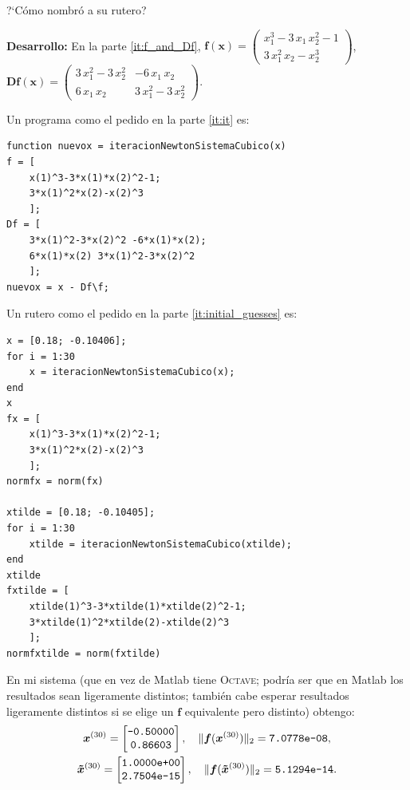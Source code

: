 \documentclass[letter,11pt]{article}
\newcommand{\matlab}{{\sc Matlab} }
\begin{document}
\begin{enumerate}
\begin{enumerate}
\medskip
\noindent ?`C\'omo nombr\'o a su rutero?\newline
{}

\end{enumerate}

\textbf{Desarrollo:} En la parte \ref{it:f_and_Df}, $\boldsymbol{f}(\boldsymbol{x}) = \begin{pmatrix} x_1^3 - 3 \, x_1 \, x_2^2 - 1\\ 3 \, x_1^2 \, x_2 - x_2^3\end{pmatrix}$, $\boldsymbol{D} \boldsymbol{f}(\boldsymbol{x}) = \begin{pmatrix} 3\, x_1^2 - 3\, x_2^2 & -6 \, x_1 \, x_2 \\ 6 \, x_1 \, x_2 & 3\, x_1^2 - 3 \, x_2^2 \end{pmatrix}$.

Un programa como el pedido en la parte \ref{it:it} es:
\begin{lstlisting}
function nuevox = iteracionNewtonSistemaCubico(x)
f = [
    x(1)^3-3*x(1)*x(2)^2-1;
    3*x(1)^2*x(2)-x(2)^3
    ];
Df = [
    3*x(1)^2-3*x(2)^2 -6*x(1)*x(2);
    6*x(1)*x(2) 3*x(1)^2-3*x(2)^2
    ];
nuevox = x - Df\f;
\end{lstlisting}

Un rutero como el pedido en la parte \ref{it:initial_guesses} es:
\begin{lstlisting}
x = [0.18; -0.10406];
for i = 1:30
    x = iteracionNewtonSistemaCubico(x);
end
x
fx = [
    x(1)^3-3*x(1)*x(2)^2-1;
    3*x(1)^2*x(2)-x(2)^3
    ];
normfx = norm(fx)

xtilde = [0.18; -0.10405];
for i = 1:30
    xtilde = iteracionNewtonSistemaCubico(xtilde);
end
xtilde
fxtilde = [
    xtilde(1)^3-3*xtilde(1)*xtilde(2)^2-1;
    3*xtilde(1)^2*xtilde(2)-xtilde(2)^3
    ];
normfxtilde = norm(fxtilde)
\end{lstlisting}

En mi sistema (que en vez de \matlab tiene \textsc{Octave}; podr\'ia ser que en \matlab los resultados sean ligeramente distintos; tambi\'en cabe esperar resultados ligeramente distintos si se elige un $\boldsymbol{f}$ equivalente pero distinto) obtengo:
\begin{gather*}
\boldsymbol{x}^{(30)} = \begin{bmatrix} \text{\texttt{-0.50000}} \\ \text{\texttt{0.86603}} \end{bmatrix}, \quad \|\boldsymbol{f}(\boldsymbol{x}^{(30)})\|_2 = \text{\texttt{7.0778e-08}},\\
\boldsymbol{\tilde x}^{(30)} = \begin{bmatrix} \text{\texttt{1.0000e+00}} \\ \text{\texttt{2.7504e-15}} \end{bmatrix}, \quad \|\boldsymbol{f}(\boldsymbol{\tilde x}^{(30)})\|_2 = \text{\texttt{5.1294e-14}}.
\end{gather*}


\end{enumerate}
\end{document}
